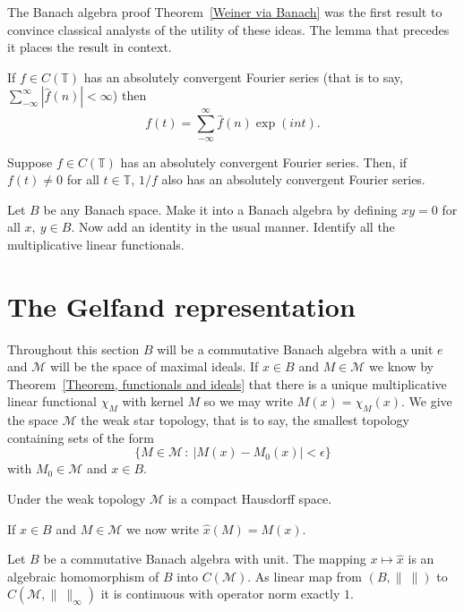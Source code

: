 The Banach algebra proof Theorem~\ref{Weiner via Banach}
was the first result to convince classical analysts
of the utility of these ideas. The lemma that precedes
it places the result in context.
\begin{lemma} If $f\in C({\mathbb T})$ has 
an absolutely convergent
Fourier series (that is to say,
$\sum_{-\infty}^{\infty}|\hat{f}(n)|<\infty$)
then
\[f(t)=\sum_{-\infty}^{\infty}\hat{f}(n)\exp(int).\]
\end{lemma}
\begin{theorem}\label{Weiner via Banach} 
Suppose
$f\in C({\mathbb T})$ has an absolutely convergent
Fourier series.
Then, if $f(t)\neq 0$ for all $t\in{\mathbb T}$,
$1/f$ also has an absolutely convergent
Fourier series.
\end{theorem}
\begin{exercise}\label{Exercise, not many ideals}
Let $B$ be any Banach space.
Make it into a Banach algebra by defining $xy=0$
for all $x,\ y\in B$. Now add an identity in the
usual manner. Identify all the multiplicative 
linear functionals.
\end{exercise}
\section{The Gelfand representation}
Throughout
this section $B$ will be a commutative Banach
algebra with a unit $e$ and ${\mathcal M}$ will
be the space of maximal ideals.
If $x\in B$ and $M\in{\mathcal M}$
we know by
Theorem~\ref{Theorem, functionals and ideals}
that there is a unique multiplicative linear
functional $\chi_{M}$ with kernel $M$
so we may write $M(x)=\chi_{M}(x)$.
We give the space
${\mathcal M}$ the weak star topology, that
is to say, the smallest topology containing
sets of the form
\[\{M\in {\mathcal M}\,:\ |M(x)-M_{0}(x)|<\epsilon\}\]
with $M_{0}\in {\mathcal M}$ and $x\in B$.
\begin{lemma} Under the weak topology ${\mathcal M}$ is
a compact Hausdorff space.
\end{lemma}

If $x\in B$ and $M\in{\mathcal M}$ we now write
$\hat{x}(M)=M(x)$.
\begin{lemma} Let $B$ be a commutative Banach algebra with unit.
The mapping $x\mapsto \hat{x}$
is an algebraic homomorphism of $B$ into $C({\mathcal M})$.
As linear map from $(B,\|\ \|)$ to $C({\mathcal M},\|\ \|_{\infty})$
it is continuous with operator norm exactly $1$.
\end{lemma}


